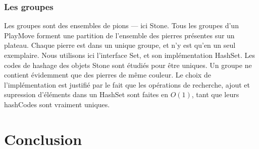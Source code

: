 \documentclass[11pt,a4paper,titlepage,french]{article}
\begin{document}
			\subsubsection{Les groupes}\label{groupes}

				Les groupes sont des ensembles de pions --- ici Stone. Tous les groupes d'un PlayMove forment une partition de l'ensemble des pierres présentes sur un plateau. Chaque pierre est dans un unique groupe, et n'y est qu'en un seul exemplaire. Nous utilisons ici l'interface Set, et son implémentation HashSet. Les codes de hashage des objets Stone sont étudiés pour être uniques. Un groupe ne contient évidemment que des pierres de même couleur. Le choix de l'implémentation est justifié par le fait que les opérations de recherche, ajout et supression d'éléments dans un HashSet sont faites en $O(1)$, tant que leurs hashCodes sont vraiment uniques.

	\section*{Conclusion}
\end{document}
